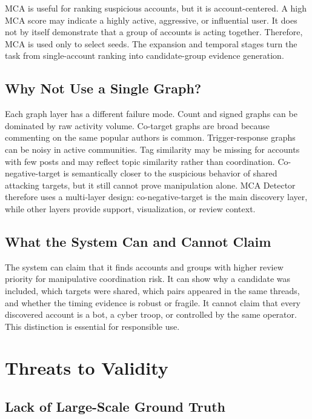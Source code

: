 \documentclass[conference]{IEEEtran}
\begin{document}
MCA is useful for ranking suspicious accounts, but it is account-centered. A
high MCA score may indicate a highly active, aggressive, or influential user.
It does not by itself demonstrate that a group of accounts is acting together.
Therefore, MCA is used only to select seeds. The expansion and temporal stages
turn the task from single-account ranking into candidate-group evidence
generation.

\subsection{Why Not Use a Single Graph?}

Each graph layer has a different failure mode. Count and signed graphs can be
dominated by raw activity volume. Co-target graphs are broad because commenting
on the same popular authors is common. Trigger-response graphs can be noisy in
active communities. Tag similarity may be missing for accounts with few posts
and may reflect topic similarity rather than coordination. Co-negative-target
is semantically closer to the suspicious behavior of shared attacking targets,
but it still cannot prove manipulation alone. MCA Detector therefore uses a
multi-layer design: co-negative-target is the main discovery layer, while
other layers provide support, visualization, or review context.

\subsection{What the System Can and Cannot Claim}

The system can claim that it finds accounts and groups with higher review
priority for manipulative coordination risk. It can show why a candidate was
included, which targets were shared, which pairs appeared in the same threads,
and whether the timing evidence is robust or fragile. It cannot claim that
every discovered account is a bot, a cyber troop, or controlled by the same
operator. This distinction is essential for responsible use.

\section{Threats to Validity}

\subsection{Lack of Large-Scale Ground Truth}
\end{document}
